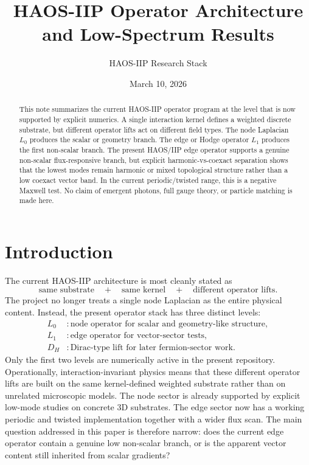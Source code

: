 \documentclass[11pt]{article}
\title{HAOS-IIP Operator Architecture and Low-Spectrum Results}
\author{HAOS-IIP Research Stack}
\date{March 10, 2026}
\begin{document}
\maketitle

\begin{abstract}
This note summarizes the current HAOS-IIP operator program at the level that is now supported by explicit numerics. A single interaction kernel defines a weighted discrete substrate, but different operator lifts act on different field types. The node Laplacian $L_0$ produces the scalar or geometry branch. The edge or Hodge operator $L_1$ produces the first non-scalar branch. The present HAOS/IIP edge operator supports a genuine non-scalar flux-responsive branch, but explicit harmonic-vs-coexact separation shows that the lowest modes remain harmonic or mixed topological structure rather than a low coexact vector band. In the current periodic/twisted range, this is a negative Maxwell test. No claim of emergent photons, full gauge theory, or particle matching is made here.
\end{abstract}

\section{Introduction}
The current HAOS-IIP architecture is most cleanly stated as
\begin{equation}
\text{same substrate} \quad + \quad \text{same kernel} \quad + \quad \text{different operator lifts}.
\end{equation}
The project no longer treats a single node Laplacian as the entire physical content. Instead, the present operator stack has three distinct levels:
\begin{align}
L_0 &: \text{node operator for scalar and geometry-like structure}, \\
L_1 &: \text{edge operator for vector-sector tests}, \\
D_H &: \text{Dirac-type lift for later fermion-sector work}.
\end{align}
Only the first two levels are numerically active in the present repository. Operationally, interaction-invariant physics means that these different operator lifts are built on the same kernel-defined weighted substrate rather than on unrelated microscopic models. The node sector is already supported by explicit low-mode studies on concrete $3$D substrates. The edge sector now has a working periodic and twisted implementation together with a wider flux scan. The main question addressed in this paper is therefore narrow: does the current edge operator contain a genuine low non-scalar branch, or is the apparent vector content still inherited from scalar gradients?
\end{document}

